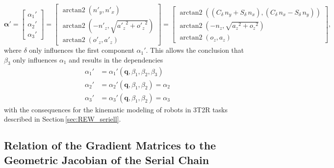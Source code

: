 \documentclass[robotics,article,accept,moreauthors,pdftex]{Definitions/mdpi}
\newcommand{\bm}[1]{\boldsymbol{#1}}
\DeclareMathOperator{\arctantwo}{arctan2}
\begin{document}
%
\begin{equation}
\bm{\alpha}'
=
\begin{bmatrix}
\alpha_1' \\
\alpha_2' \\
\alpha_3'
\end{bmatrix}
=
\begin{bmatrix}
\arctantwo \left( {n'_y} , { n'_x} \right) \\ 
\arctantwo \left( -{n'_z} , \sqrt {{{a'_z}}^{2}+{{ o'_z}}^{2}} \right) \\ 
\arctantwo \left( {o'_z} , {a'_z} \right)
\end{bmatrix}
=
\begin{bmatrix}
\arctantwo \left( ({ C_{\delta}}\,{n_y}+{ S_{\delta}}\,{n_x}) , ({ C_{\delta}}\,{n_x}-{ S_{\delta}}\,{n_y}) \right) \\
\arctantwo \left( -{n_z} , \sqrt {{{a_z}}^{2}+{{ o_z}}^{2}} \right) \\
\arctantwo \left( {o_z} , {a_z} \right)
\end{bmatrix},
\end{equation}
%
where $\delta$ only influences the first component $\alpha_1'$.
This allows the conclusion that $\beta_3$ only influences $\alpha_1$ and results in the dependencies
%
\begin{align}
    \alpha_1'&=\alpha_1'(\bm{q},\beta_1,\beta_2,\beta_3)\\
    \alpha_2'&=\alpha_2'(\bm{q},\beta_1,\beta_2) =\alpha_2\\
    \alpha_3'&=\alpha_3'(\bm{q},\beta_1,\beta_2) =\alpha_3
\end{align}
%
with the consequences for the kinematic modeling of robots in 3T2R tasks described in Section\,\ref{sec:REW_seriell}.

\subsection{Relation of the Gradient Matrices to the Geometric Jacobian of the Serial Chain}
\label{sec:appendix_gradient_geomjacobian}

\end{document}
